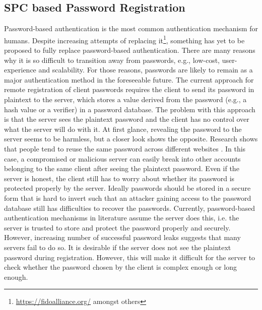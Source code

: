 \subsection{SPC based Password Registration}\label{sec:protocol}
Password-based authentication is the most common authentication mechanism for humans. Despite increasing attempts of replacing it\footnote{\url{https://fidoalliance.org/} amongst others}, something has yet to be proposed to fully replace password-based authentication. 
There are many reasons why it is so difficult to transition away from passwords, e.g., low-cost, user-experience and scalability. For those reasons, passwords are likely to remain as a major authentication method in the foreseeable future. 
The current approach for remote registration of client passwords requires the client to send its password in plaintext to the server, which stores a value derived from the password (e.g., a hash value or a verifier) in a password database. 
The problem with this approach is that the server sees the plaintext password and the client has no control over what the server will do with it. 
At first glance, revealing the password to the server seems to be harmless, but a closer look shows the opposite. Research shows that people tend to reuse the same password across different websites \cite{Florencio2007,Gaw2006,das14}. 
In this case, a compromised or malicious server can easily break into other accounts belonging to the same client after seeing the plaintext password. 
Even if the server is honest, the client still has to worry about whether its password is protected properly by the server. 
Ideally passwords should be stored in a secure form that is hard to invert such that an attacker gaining access to the password database still has difficulties to recover the passwords. 
Currently, password-based authentication mechanisms in literature assume the server does this, i.e. the server is trusted to store and protect the password properly and securely. 
However, increasing number of successful password leaks \cite{cupidBreach,rockyouBreach,adobeBreach} suggests that many servers fail to do so. It is desirable if the server does not see the plaintext password during registration. However, this will make it difficult for the server to check whether the password chosen by the client is complex enough or long enough.  

